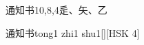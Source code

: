 \begin{entry}{通知书}{10,8,4}{⾡、⽮、⼄}
  \begin{phonetics}{通知书}{tong1 zhi1 shu1}[][HSK 4]
  \end{phonetics}
\end{entry}

